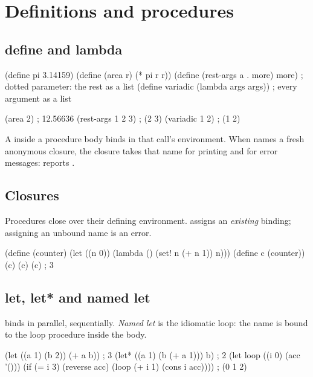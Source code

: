\chapter{Definitions and procedures}

\section{define and lambda}

\begin{scm}
(define pi 3.14159)
(define (area r) (* pi r r))
(define (rest-args a . more) more)    ; dotted parameter: the rest as a list
(define variadic (lambda args args))  ; every argument as a list

(area 2)               ; 12.56636
(rest-args 1 2 3)      ; (2 3)
(variadic 1 2)         ; (1 2)
\end{scm}

A  inside a procedure body binds in that call's environment.
When  names a fresh anonymous closure, the closure takes that
name for printing and for error messages:  reports .

\section{Closures}

Procedures close over their defining environment.  assigns an
\emph{existing} binding; assigning an unbound name is an error.

\begin{scm}
(define (counter)
  (let ((n 0))
    (lambda () (set! n (+ n 1)) n)))
(define c (counter))
(c) (c) (c)   ; 3
\end{scm}

\section{let, let* and named let}

 binds in parallel,  sequentially. \emph{Named let}
is the idiomatic loop: the name is bound to the loop procedure inside the
body.

\begin{scm}
(let ((a 1) (b 2)) (+ a b))            ; 3
(let* ((a 1) (b (+ a 1))) b)           ; 2
(let loop ((i 0) (acc '()))
  (if (= i 3)
      (reverse acc)
      (loop (+ i 1) (cons i acc))))    ; (0 1 2)
\end{scm}

